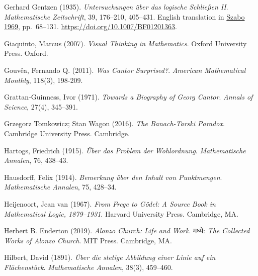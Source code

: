 \par\medskip{}\label{bib:Gentzen1935b}
Gerhard Gentzen (1935). \emph{Untersuchungen \"uber das logische {S}chlie\ss en {II}}. \emph{Mathe\-mati\-sche Zeit\-schrift}, 39, 176--210, 405--431. {E}nglish translation in \hyperref[bib:Gentzen1969]{Szabo 1969}, pp.~68--131. \url{https://doi.org/10.1007/BF01201363}.

\par\medskip{}\label{bib:Giaquinto2007}
Giaquinto, Marcus (2007). \emph{Visual Thinking in Mathematics}. Oxford University Press. Oxford.

\par\medskip{}\label{bib:Gouvea2011}
Gouv\^{e}a, Fernando Q. (2011). \emph{Was {C}antor Surprised?}. \emph{American Mathematical Monthly}, 118(3), 198-209.

\par\medskip{}\label{bib:Grattan-Guinness1971}
Grattan-Guinness, Ivor (1971). \emph{Towards a Biography of {G}eorg {C}antor}. \emph{Annals of Science}, 27(4), 345--391.

\par\medskip{}\label{bib:Wagon2016}
Grzegorz {Tomkowicz}; Stan {Wagon} (2016). \emph{The {Banach}-{Tarski} Paradox}. Cambridge University Press. Cambridge.

\par\medskip{}\label{bib:Hartogs1915}
Hartogs, Friedrich (1915). \emph{\"{U}ber das {P}roblem der {W}ohlordnung}. \emph{Mathematische Annalen}, 76, 438--43.

\par\medskip{}\label{bib:Hausdorff1914}
Hausdorff, Felix (1914). \emph{Bemerkung über den {Inhalt} von {Punktmengen}}. \emph{Mathematische Annalen}, 75, 428--34.

\par\medskip{}\label{bib:Heijenoort1967}
Heijenoort, Jean van (1967). \emph{From {F}rege to {G}\"{o}del: A Source Book in Mathematical Logic, 1879--1931}. Harvard University Press. Cambridge, MA.

\par\medskip{}\label{bib:EndertonND}
Herbert B. Enderton (2019). \emph{{A}lonzo {C}hurch: {L}ife and {W}ork}. मध्ये: \emph{The Collected Works of {A}lonzo {C}hurch}. MIT Press. Cambridge, MA.

\par\medskip{}\label{bib:Hilbert1891}
Hilbert, David (1891). \emph{\"{U}ber die stetige {Abbildung} einer {Linie} auf ein {Fl\"{a}chenst\"{u}ck}}. \emph{Mathematische Annalen}, 38(3), 459--460.


